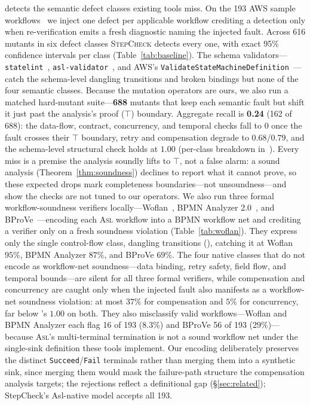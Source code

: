 \tool{} detects the semantic defect classes existing tools miss. On the 193 AWS sample
workflows~\cite{awsServerlessPatterns} we
inject one defect per applicable workflow crediting a detection only
when re-verification emits a fresh diagnostic naming the injected fault.
Across 616 mutants in six defect classes \textsc{StepCheck} detects
every one, with exact 95\% confidence intervals per class (Table~\ref{tab:baseline}).
The schema
validators---\texttt{statelint}~\cite{awsStatelint}, \texttt{asl-validator}~\cite{aslValidator}, and
AWS's \texttt{ValidateStateMachineDefinition}~\cite{awsValidateDefinition}---catch
the schema-level dangling transitions and broken bindings but none of the four semantic classes.
Because the mutation operators are ours, we also run a matched hard-mutant suite---\textbf{688}
mutants that keep each semantic fault but shift it just past the analysis's proof ($\top$) boundary.
Aggregate recall is \textbf{0.24} (162 of 688): the data-flow, contract, concurrency, and temporal
checks fall to $0$ once the fault crosses their $\top$ boundary, retry and compensation degrade to
$0.68$/$0.79$, and the schema-level structural check holds at $1.00$ (per-class breakdown in~\cite{stepcheck-repo}). Every miss is a premise the analysis
soundly lifts to $\top$, not a false alarm: a sound analysis (Theorem~\ref{thm:soundness}) declines
to report what it cannot prove, so these expected drops mark completeness boundaries---not
unsoundness---and show the checks are not tuned to our operators.
We also run three formal workflow-soundness verifiers
locally---Woflan~\cite{woflan}, BPMN Analyzer 2.0~\cite{bpmnanalyzer},
and BProVe~\cite{bprove}---encoding each \textsc{Asl} workflow into a
BPMN workflow net and crediting a verifier only on a fresh soundness
violation (Table~\ref{tab:woflan}).
They express only
the single control-flow class, dangling transitions (), catching it at Woflan $95\%$, BPMN
Analyzer $87\%$, and BProVe $69\%$. The four native classes that do not encode as workflow-net
soundness---data binding, retry safety, field flow, and temporal bounds---are silent for all three
formal verifiers, while compensation and concurrency are caught only when the injected fault also
manifests as a workflow-net soundness violation: at most $37\%$ for compensation and $5\%$ for
concurrency, far below \tool{}'s $1.00$ on both.
They also misclassify valid workflows---Woflan and BPMN Analyzer each
flag 16 of 193 (8.3\%) and BProVe 56 of 193 (29\%)---because
\textsc{Asl}'s multi-terminal termination is not a sound workflow net
under the single-sink definition these tools implement. Our encoding
deliberately preserves the distinct \texttt{Succeed}/\texttt{Fail}
terminals rather than merging them into a synthetic sink, since merging them would mask the failure-path structure the compensation analysis targets; 
the rejections reflect a definitional gap (\S\ref{sec:related}); StepCheck's Asl-native model accepts all 193.



